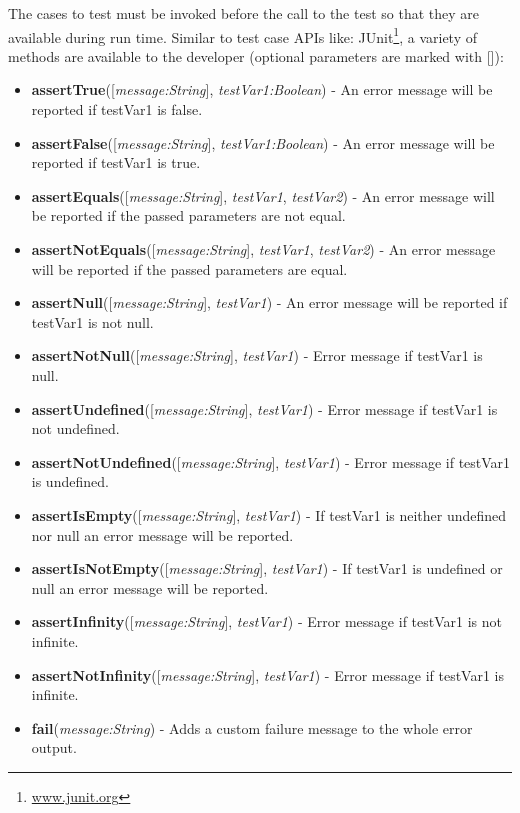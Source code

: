 The cases to test must be invoked before the call to the test so that they are available during run time.
Similar to test case APIs like: JUnit\footnote{\href{http://www.junit.org}{www.junit.org}}, a variety of methods are available to the developer (optional parameters are marked with []):

\begin{itemize}
	\item \textbf{assertTrue}([\textit{message:String}], \textit{testVar1:Boolean}) - An error message will be reported if testVar1 is false.
	\item \textbf{assertFalse}([\textit{message:String}],\textit{ testVar1:Boolean}) - An error message will be reported if testVar1 is true.
	\item \textbf{assertEquals}([\textit{message:String}], \textit{testVar1}, \textit{testVar2}) - An error message will be reported if the passed parameters are not equal.
	\item \textbf{assertNotEquals}([\textit{message:String}], \textit{testVar1}, \textit{testVar2}) - An error message will be reported if the passed parameters are equal.
	\item \textbf{assertNull}([\textit{message:String}], \textit{testVar1}) - An error message will be reported if testVar1 is not null.
	\item \textbf{assertNotNull}([\textit{message:String}], \textit{testVar1}) - Error message if testVar1 is null.
	\item \textbf{assertUndefined}([\textit{message:String}], \textit{testVar1}) - Error message if testVar1 is not undefined.
	\item \textbf{assertNotUndefined}([\textit{message:String}], \textit{testVar1}) - Error message if testVar1 is undefined.
	\item \textbf{assertIsEmpty}([\textit{message:String}], \textit{testVar1}) - If testVar1 is neither undefined nor null an error message will be reported.
	\item \textbf{assertIsNotEmpty}([\textit{message:String}], \textit{testVar1}) - If testVar1 is undefined or null an error message will be reported.
	\item \textbf{assertInfinity}([\textit{message:String}], \textit{testVar1}) - Error message if testVar1 is not infinite.
	\item \textbf{assertNotInfinity}([\textit{message:String}], \textit{testVar1}) - Error message if testVar1 is infinite.
	\item \textbf{fail}(\textit{message:String}) - Adds a custom failure message to the whole error output.

\end{itemize}
